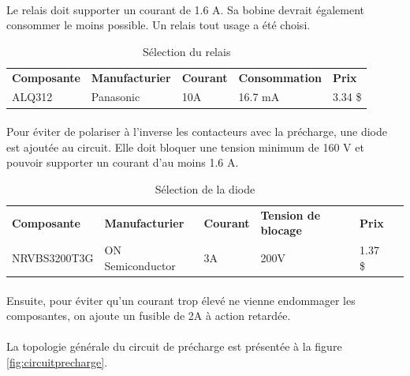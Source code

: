 		\paragraph*{}
		Le relais doit supporter un courant de 1.6 A. Sa bobine devrait également consommer le moins possible. Un relais tout usage a été choisi.

		\begin{table}[H]
			\centering
			\caption{Sélection du relais}
			\label{RelaisPrecharge}
			\renewcommand{\arraystretch}{1.3}
			\begin{tabular}{|p{3cm}|p{3cm}|p{3cm}|p{3cm}|p{3cm}|}
				\hline
				\textbf{Composante} & \textbf{Manufacturier} &  \textbf{Courant} & \textbf{Consommation} & \textbf{Prix}
				\\ \hhline{|=|=|=|=|=|}
				ALQ312 & Panasonic & 10A & 16.7 mA & 3.34 \$ \\ \hline
			\end{tabular}
		\end{table}


		\paragraph*{}
		Pour éviter de polariser à l'inverse les contacteurs avec la précharge, une diode est ajoutée au circuit. Elle doit bloquer une tension minimum de 160 V et pouvoir supporter un courant d'au moins 1.6 A.

		\begin{table}[H]
			\centering
			\caption{Sélection de la diode}
			\label{DiodePrecharge}
			\renewcommand{\arraystretch}{1.3}
			\begin{tabular}{|p{3cm}|p{3.5cm}|p{2cm}|p{3.5cm}|p{3cm}|p{3cm}|}
				\hline
				\textbf{Composante} & \textbf{Manufacturier} & \textbf{Courant} &  \textbf{Tension de blocage} & \textbf{Prix}
				\\ \hhline{|=|=|=|=|=|=|}
				NRVBS3200T3G & ON Semiconductor & 3A & 200V & 1.37 \$ \\ \hline
			\end{tabular}
		\end{table}

		\paragraph*{}
		Ensuite, pour éviter qu'un courant trop élevé ne vienne endommager les composantes, on ajoute un fusible de 2A à action retardée.

		\paragraph*{}
		La topologie générale du circuit de précharge est présentée à la figure \ref{fig:circuitprecharge}.


